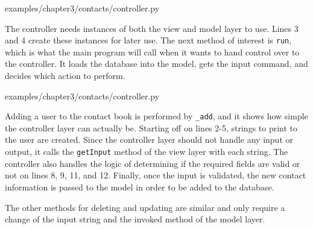 \documentclass[12pt, oneside, a4paper]{book}
\begin{document}
      
      {examples/chapter3/contacts/controller.py}

      The controller needs instances of both the view and model layer to use.
      Lines 3 and 4 create these instances for later use.
      The next method of interest is \lstinline!run!, which is what the main program will call when it wants to hand control over to the controller.
      It loads the database into the model, gets the input command, and decides which action to perform.

      
      {examples/chapter3/contacts/controller.py}

      Adding a user to the contact book is performed by \lstinline!_add!, and it shows how simple the controller layer can actually be.
      Starting off on lines 2-5, strings to print to the user are created.
      Since the controller layer should not handle any input or output, it calls the \lstinline!getInput! method of the view layer with each string.
      The controller also handles the logic of determining if the required fields are valid or not on lines 8, 9, 11, and 12.
      Finally, once the input is validated, the new contact information is passed to the model in order to be added to the database.

      The other methods for deleting and updating are similar and only require a change of the input string and the invoked method of the model layer.
\end{document}
